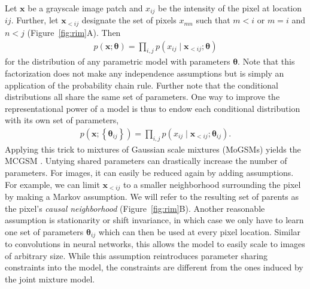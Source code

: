 \documentclass{article}
\begin{document}
		Let $\mathbf{x}$ be a grayscale image patch and $x_{ij}$ be the intensity of the pixel at location
		$ij$. Further, let $\mathbf{x}_{<ij}$ designate the set of pixels $x_{mn}$ such that $m < i$
		or $m = i$ and $n < j$ (Figure~\ref{fig:rim}A). Then
		\begin{align}
			\textstyle
			p(\mathbf{x}; \bm{\theta}) = \prod_{i,j} p(x_{ij} \mid \mathbf{x}_{<ij}; \bm{\theta})
			\label{eq:factorization}
		\end{align}
		for the distribution of any parametric model with parameters $\bm{\theta}$. Note that this
		factorization does not make any independence assumptions but is simply an
		application of the probability chain rule. Further note that the conditional distributions
		all share the same set of parameters. One way to improve the
		representational power of a model is thus to endow each conditional distribution with its own set of parameters,
		\begin{align}
			\textstyle
			p(\mathbf{x}; \left\{ \bm{\theta}_{ij} \right\}) = \prod_{i,j} p(x_{ij} \mid \mathbf{x}_{<ij}; \bm{\theta}_{ij}).
			\label{eq:factorization2}
		\end{align}
		Applying this trick to mixtures of Gaussian scale mixtures (MoGSMs) yields the MCGSM \cite{Theis:2011}.
		Untying shared parameters can drastically increase the number of parameters. For images, it
		can easily be reduced again by adding assumptions. For example, we can limit
		$\mathbf{x}_{<ij}$ to a smaller neighborhood surrounding the pixel by making a Markov
		assumption. We will refer to the resulting set of parents as the pixel's \textit{causal neighborhood} (Figure~\ref{fig:rim}B).
		Another reasonable assumption is stationarity or shift invariance, in which case we only have
		to learn one set of parameters $\bm{\theta}_{ij}$ which can then be used at every pixel
		location. Similar to convolutions in neural networks, this allows the model to easily scale to images of arbitrary size.
		While this assumption reintroduces parameter sharing constraints into the model, the constraints are
		different from the ones induced by the joint mixture model.
\end{document}
